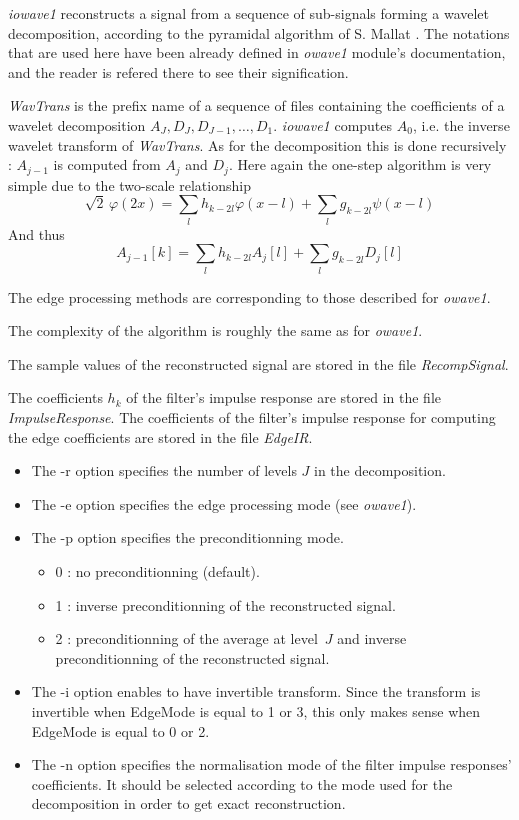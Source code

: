 \def\real{I\!\!R}


{\em iowave1} reconstructs a signal from a sequence of sub-signals forming a wavelet decomposition, according to the pyramidal algorithm of S. Mallat \cite{kn:ma1}. 
The notations that are used here have been already defined in {\em owave1} module's documentation, and the reader is refered there to see their signification. 

{\em WavTrans} is the prefix name of a sequence of files containing the coefficients of a wavelet decomposition \( A_{J}, D_{J}, D_{J-1}, \ldots, D_{1} \). {\em iowave1} computes \( A_{0} \), i.e. the inverse wavelet transform of {\em WavTrans}. 
As for the decomposition this is done recursively : \( A_{j-1} \) is computed from \( A_{j} \) and \( D_{j} \). Here again the one-step algorithm is very simple due to the two-scale relationship 
\[
\sqrt{2} \, \varphi(2x) = \sum_{l} h_{k-2l} \varphi(x-l) + \sum_{l} g_{k-2l} \psi(x-l)
\]
And thus
\[
A_{j-1}[k] = \sum_{l} h_{k-2l} A_{j}[l] + \sum_{l} g_{k-2l} D_{j}[l]
\]

The edge processing methods are corresponding to those described for {\em owave1}.

The complexity of the algorithm is roughly the same as for {\em owave1}.

The sample values of the reconstructed signal are stored in the file {\em RecompSignal}. 

The coefficients \( h_{k} \) of the filter's impulse response are stored in the file {\em ImpulseResponse}. The coefficients of the filter's impulse response for computing the edge coefficients are stored in the file {\em EdgeIR}. 

\begin{itemize}
\item
The -r option specifies the number of levels $J$ in the decomposition.
\item
The -e option specifies the edge processing mode (see {\em owave1}).
\item
The -p option specifies the preconditionning mode.
\begin{itemize}
\item
0 : no preconditionning (default).
\item
1 : inverse preconditionning of the reconstructed signal.
\item
2 : preconditionning of the average at level~$J$ and inverse preconditionning of the reconstructed signal.
\end{itemize}
\item
The -i option enables to have invertible transform. Since the transform is invertible when EdgeMode is equal to 1 or 3, this only makes sense when EdgeMode is equal to 0 or 2. 
\item
The -n option specifies the normalisation mode of the filter impulse responses' coefficients. It should be selected according to the mode used for the decomposition in order to get exact reconstruction. 
\end{itemize}



